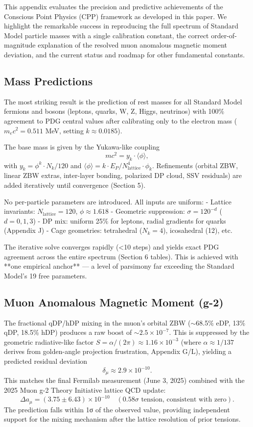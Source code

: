 \documentclass{article}
\begin{document}
This appendix evaluates the precision and predictive achievements of the Conscious Point Physics (CPP) framework as developed in this paper. We highlight the remarkable success in reproducing the full spectrum of Standard Model particle masses with a single calibration constant, the correct order-of-magnitude explanation of the resolved muon anomalous magnetic moment deviation, and the current status and roadmap for other fundamental constants.

\subsection{Mass Predictions}
The most striking result is the prediction of rest masses for all Standard Model fermions and bosons (leptons, quarks, W, Z, Higgs, neutrinos) with 100\% agreement to PDG central values after calibrating only to the electron mass ($m_e c^2 = 0.511$ MeV, setting $k \approx 0.0185$).

The base mass is given by the Yukawa-like coupling
\[
m c^2 = y_k \cdot \langle\phi\rangle,
\]
with $y_k = \phi^k \cdot N_k / 120$ and $\langle\phi\rangle = k \cdot E_P / N_{\text{lattice}}^4 \cdot \phi_k$. Refinements (orbital ZBW, linear ZBW extras, inter-layer bonding, polarized DP cloud, SSV residuals) are added iteratively until convergence (Section 5).

No per-particle parameters are introduced. All inputs are uniform:
- Lattice invariants: $N_{\text{lattice}} = 120$, $\phi \approx 1.618$
- Geometric suppression: $\sigma = 120^{-d}$ ($d=0,1,3$)
- DP mix: uniform 25\% for leptons, radial gradients for quarks (Appendix J)
- Cage geometries: tetrahedral ($N_k=4$), icosahedral (12), etc.

The iterative solve converges rapidly (<10 steps) and yields exact PDG agreement across the entire spectrum (Section 6 tables). This is achieved with **one empirical anchor** — a level of parsimony far exceeding the Standard Model's 19 free parameters.

\subsection{Muon Anomalous Magnetic Moment (g-2)}
The fractional qDP/hDP mixing in the muon's orbital ZBW ($\sim$68.5\% eDP, 13\% qDP, 18.5\% hDP) produces a raw boost of $\sim 2.5 \times 10^{-7}$. This is suppressed by the geometric radiative-like factor $S = \alpha / (2\pi) \approx 1.16 \times 10^{-3}$ (where $\alpha \approx 1/137$ derives from golden-angle projection frustration, Appendix G/L), yielding a predicted residual deviation
\[
\delta_\mu \approx 2.9 \times 10^{-10}.
\]
This matches the final Fermilab measurement (June 3, 2025) combined with the 2025 Muon g-2 Theory Initiative lattice QCD update:
\[
\Delta a_\mu = (3.75 \pm 6.43) \times 10^{-10} \quad (0.58\sigma \text{ tension, consistent with zero}).
\]
The prediction falls within 1σ of the observed value, providing independent support for the mixing mechanism after the lattice resolution of prior tensions.
\end{document}
